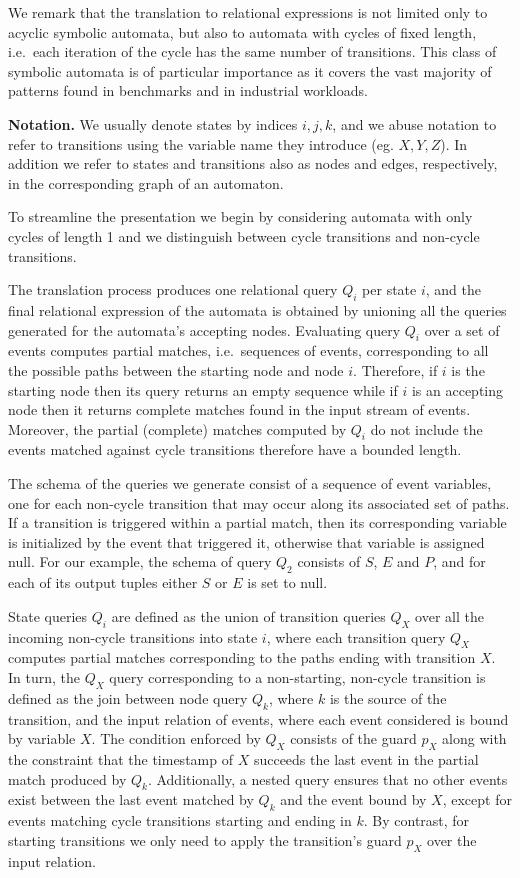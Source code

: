 We remark that the translation to relational expressions is not limited only to 
acyclic symbolic automata, but also to automata with cycles of fixed length, 
i.e.\ each iteration of the cycle has the same number of transitions.
This class of symbolic automata is of particular importance as it covers the 
vast majority of patterns found in benchmarks and in industrial workloads.  




{\bf Notation.}
We usually denote states by indices $i, j, k$, and we abuse notation to refer 
to transitions using the variable name they introduce (eg. $X, Y, Z$).
In addition we refer to states and transitions also as nodes and edges, 
respectively, in the corresponding graph of an automaton.

To streamline the presentation we begin by considering automata with only
cycles of length 1 and we distinguish between cycle transitions and
non-cycle transitions.


The translation process produces one relational query $Q_i$ per state $i$, and 
the final relational expression of the automata is obtained by unioning all the 
queries generated for the automata's accepting nodes.
Evaluating query $Q_i$ over a set of events computes partial matches, i.e.\ 
sequences of events, corresponding to all the possible paths between the 
starting node and node $i$.
Therefore, if $i$ is the starting node then its query returns an empty sequence 
while if $i$ is an accepting node then it returns complete matches found in the 
input stream of events.
Moreover, the partial (complete) matches computed by $Q_i$ do not include the 
events matched against cycle transitions therefore have a bounded length. 

The schema of the queries we generate consist of a sequence of event variables, 
one for each non-cycle transition that may occur along its associated set of 
paths. 
If a transition is triggered within a partial match, then its corresponding 
variable is initialized by the event that triggered it, otherwise that variable 
is assigned null.
For our example, the schema of query $Q_2$ consists of $S$, $E$ and $P$, and 
for each of its output tuples either $S$ or $E$ is set to null.


State queries $Q_i$ are defined as the union of transition queries $Q_X$ over 
all the incoming non-cycle transitions into state $i$, where each transition 
query $Q_X$ computes partial matches corresponding to the paths ending with 
transition $X$.
In turn, the $Q_X$ query corresponding to a non-starting, non-cycle transition 
is defined as the join between node query $Q_k$, where $k$ is the source of the 
transition, and the input relation of events, where each event considered is 
bound by variable $X$.
The condition enforced by $Q_X$ consists of the guard $p_X$ along with the 
constraint that the timestamp of $X$ succeeds the last event in the partial 
match produced by $Q_k$.
Additionally, a nested query ensures that no other events 
exist between the last event matched by $Q_k$ and the event bound by $X$, 
except for events matching cycle transitions starting and ending in $k$.
By contrast, for starting transitions we only need to apply the transition's 
guard $p_X$ over the input relation.

